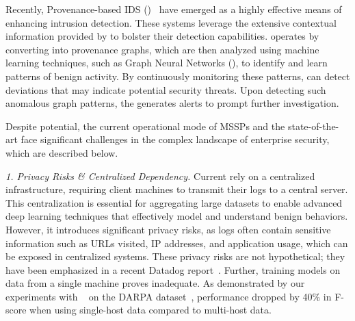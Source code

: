 Recently, Provenance-based IDS (\pids)~\cite{streamspot,provdetector2020,wang2022threatrace,shadewatcher,yangprographer,han2020unicorn,jia2023magic,flash2024,cheng2023kairos,sigl} have emerged as a highly effective means of enhancing intrusion detection. These systems leverage the extensive contextual information provided by \logs to bolster their detection capabilities. \pids operates by converting \logs into provenance graphs, which are then analyzed using machine learning techniques, such as Graph Neural Networks (\gnnshort), to identify and learn patterns of benign activity. By continuously monitoring these patterns, \pids can detect deviations that may indicate potential security threats. Upon detecting such anomalous graph patterns, the \pids generates alerts to prompt further investigation.

\smallskip
{}
\smallskip

\noindent
Despite \pids potential, the current operational mode of MSSPs and the state-of-the-art \pids face significant challenges in the complex landscape of enterprise security, which are described below.


\noindent
\textit{1. Privacy Risks \& Centralized Dependency.} Current \pids rely on a centralized infrastructure, requiring client machines to transmit their logs to a central server. This centralization is essential for aggregating large datasets to enable advanced deep learning techniques that effectively model and understand benign behaviors. However, it introduces significant privacy risks, as logs often contain sensitive information such as URLs visited, IP addresses, and application usage, which can be exposed in centralized systems. These privacy risks are not hypothetical; they have been emphasized in a recent Datadog report~\cite{datadog}. Further, training models on data from a single machine proves inadequate. As demonstrated by our experiments with \flash~\cite{flash2024} on the DARPA \optc dataset~\cite{darpaoptc}, performance dropped by 40\% in F-score when using single-host data compared to multi-host data.

